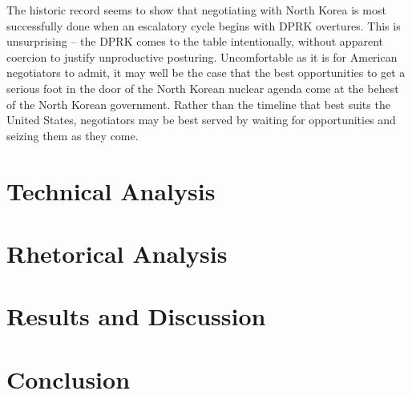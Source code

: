\documentclass{article}
\begin{document}


The historic record seems to show that negotiating with North Korea is most successfully done when an escalatory cycle begins with DPRK overtures. This is unsurprising – the DPRK comes to the table intentionally, without apparent coercion to justify unproductive posturing. Uncomfortable as it is for American negotiators to admit, it may well be the case that the best opportunities to get a serious foot in the door of the North Korean nuclear agenda come at the behest of the North Korean government. Rather than the timeline that best suits the United States, negotiators may be best served by waiting for opportunities and seizing them as they come.

\section{Technical Analysis}

\section{Rhetorical Analysis}

\section{Results and Discussion}

\section{Conclusion}





\todos
\end{document}
